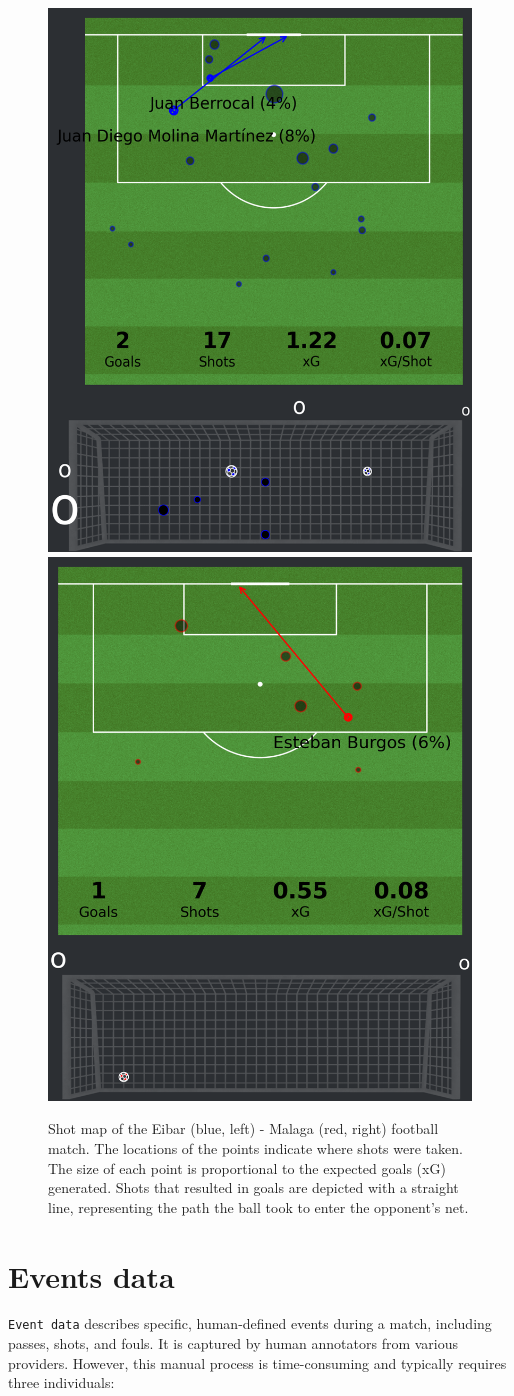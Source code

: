 \documentclass[
  10pt,
  twoside,nohyper]{book}
\begin{document}
\begin{figure}[H]

{\centering \includegraphics[width=0.45\linewidth,]{imagenes/home_shot_map} \includegraphics[width=0.45\linewidth,]{imagenes/away_shot_map} 

}

\caption{Shot map of the Eibar (blue, left) - Malaga (red, right) football match. The locations of the points indicate where shots were taken. The size of each point is proportional to the expected goals (xG) generated. Shots that resulted in goals are depicted with a straight line, representing the path the ball took to enter the opponent’s net.}\label{fig:shotmap}
\end{figure}

\section{Events data}\label{events-data}

\texttt{Event\ data} describes specific, human-defined events during a match,
including passes, shots, and fouls. It is captured by human annotators
from various providers. However, this manual process is time-consuming
and typically requires three individuals:
\end{document}
